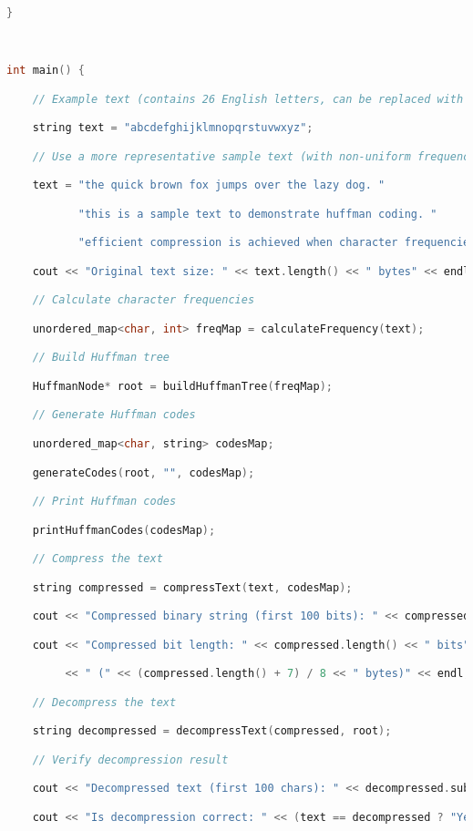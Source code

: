 \begin{lstlisting}[language=C++]
}

  

int main() {

    // Example text (contains 26 English letters, can be replaced with file input)

    string text = "abcdefghijklmnopqrstuvwxyz";

    // Use a more representative sample text (with non-uniform frequencies)

    text = "the quick brown fox jumps over the lazy dog. "

           "this is a sample text to demonstrate huffman coding. "

           "efficient compression is achieved when character frequencies vary.";

    cout << "Original text size: " << text.length() << " bytes" << endl;

    // Calculate character frequencies

    unordered_map<char, int> freqMap = calculateFrequency(text);

    // Build Huffman tree

    HuffmanNode* root = buildHuffmanTree(freqMap);

    // Generate Huffman codes

    unordered_map<char, string> codesMap;

    generateCodes(root, "", codesMap);

    // Print Huffman codes

    printHuffmanCodes(codesMap);

    // Compress the text

    string compressed = compressText(text, codesMap);

    cout << "Compressed binary string (first 100 bits): " << compressed.substr(0, 100) << "..." << endl;

    cout << "Compressed bit length: " << compressed.length() << " bits"

         << " (" << (compressed.length() + 7) / 8 << " bytes)" << endl;

    // Decompress the text

    string decompressed = decompressText(compressed, root);

    // Verify decompression result

    cout << "Decompressed text (first 100 chars): " << decompressed.substr(0, 100) << endl;

    cout << "Is decompression correct: " << (text == decompressed ? "Yes" : "No") << endl;


\end{lstlisting}
